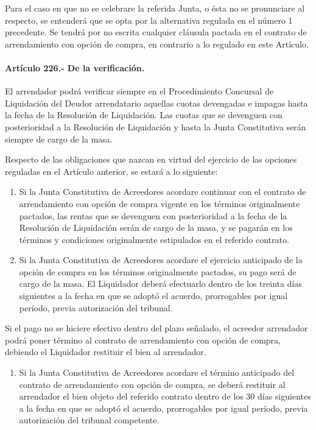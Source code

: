 \documentclass[
]{book}
\providecommand{\tightlist}{%
  \setlength{\itemsep}{0pt}\setlength{\parskip}{0pt}}
\begin{document}
Para el caso en que no se celebrare la referida Junta, o ésta no se pronunciare al respecto, se entenderá que se opta por la alternativa regulada en el número 1 precedente.
Se tendrá por no escrita cualquier cláusula pactada en el contrato de arrendamiento con opción de compra, en contrario a lo regulado en este Artículo.

\hypertarget{artuxedculo-226.--de-la-verificaciuxf3n.}{%
\paragraph*{Artículo 226.- De la verificación.}\label{artuxedculo-226.--de-la-verificaciuxf3n.}}

El arrendador podrá verificar siempre en el Procedimiento Concursal de Liquidación del Deudor arrendatario aquellas cuotas devengadas e impagas hasta la fecha de la Resolución de Liquidación. Las cuotas que se devenguen con posterioridad a la Resolución de Liquidación y hasta la Junta Constitutiva serán siempre de cargo de la masa.

Respecto de las obligaciones que nazcan en virtud del ejercicio de las opciones reguladas en el Artículo anterior, se estará a lo siguiente:

\begin{enumerate}
\def\labelenumi{\alph{enumi})}
\item
  Si la Junta Constitutiva de Acreedores acordare continuar con el contrato de arrendamiento con opción de compra vigente en los términos originalmente pactados, las rentas que se devenguen con posterioridad a la fecha de la Resolución de Liquidación serán de cargo de la masa, y se pagarán en los términos y condiciones originalmente estipulados en el referido contrato.
\item
  Si la Junta Constitutiva de Acreedores acordare el ejercicio anticipado de la opción de compra en los términos originalmente pactados, su pago será de cargo de la masa. El Liquidador deberá efectuarlo dentro de los treinta días siguientes a la fecha en que se adoptó el acuerdo, prorrogables por igual período, previa autorización del tribunal.
\end{enumerate}

Si el pago no se hiciere efectivo dentro del plazo señalado, el acreedor arrendador podrá poner término al contrato de arrendamiento con opción de compra, debiendo el Liquidador restituir el bien al arrendador.

\begin{enumerate}
\def\labelenumi{\alph{enumi})}
\setcounter{enumi}{2}
\tightlist
\item
  Si la Junta Constitutiva de Acreedores acordare el término anticipado del contrato de arrendamiento con opción de compra, se deberá restituir al arrendador el bien objeto del referido contrato dentro de los 30 días siguientes a la fecha en que se adoptó el acuerdo, prorrogables por igual período, previa autorización del tribunal competente.
\end{enumerate}
\end{document}
